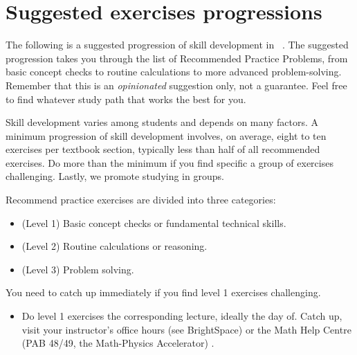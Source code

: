 \documentclass[../main.tex]{subfiles}
\begin{document}
\pagestyle{empty}
\section*{Suggested exercises progressions}

The following is a suggested progression of skill development in \thecoursesubject{}~\thecoursenumb{}.  The suggested progression takes you through the list of Recommended Practice Problems, from basic concept checks to routine calculations to more advanced problem-solving.  Remember that this is an \emph{opinionated} suggestion only, not a guarantee. Feel free to find whatever study path that works the best for you.

Skill development varies among students and depends on many factors. A minimum progression of skill development involves, on average, eight to ten exercises per textbook section, typically less than half of all recommended exercises. Do more than the minimum if you find specific a group of exercises challenging. Lastly, we promote studying in groups.

Recommend practice exercises are divided into three categories: 
\begin{itemize}
  \item (Level 1) Basic concept checks or fundamental technical skills.
  \item (Level 2) Routine calculations or reasoning.
  \item (Level 3) Problem solving.
\end{itemize}

You need to catch up immediately if you find level 1 exercises challenging.
\begin{itemize}
  \item Do level 1 exercises  the corresponding lecture, ideally the day of. Catch up, visit your instructor's office hours (see BrightSpace) or the Math Help Centre (PAB 48/49, the Math-Physics Accelerator) .
\end{itemize}
\end{document}
